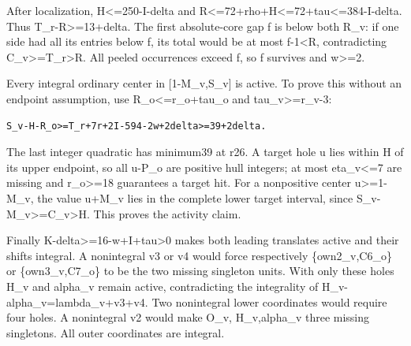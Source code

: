 \documentclass[10pt,a4paper]{article}
\theoremstyle{definition}
\begin{document}
After localization,\allowbreak{} H\textless=\allowbreak{}250-I-delta and
R\textless=\allowbreak{}72+\allowbreak{}rho+\allowbreak{}H\textless=\allowbreak{}72+\allowbreak{}tau\textless=\allowbreak{}384-I-delta. Thus
T\_\allowbreak{}r-R\textgreater=\allowbreak{}13+\allowbreak{}delta. The first absolute-core gap f is below both
R\_\allowbreak{}v: if one side had all its entries below f,\allowbreak{} its total would be at
most f-1\textless R,\allowbreak{} contradicting C\_\allowbreak{}v\textgreater=\allowbreak{}T\_\allowbreak{}r\textgreater R.
All peeled occurrences exceed f,\allowbreak{} so f survives and w\textgreater=\allowbreak{}2.

Every integral ordinary center in {[}1-M\_\allowbreak{}v,\allowbreak{}S\_\allowbreak{}v{]} is active. To prove
this without an endpoint assumption,\allowbreak{} use R\_\allowbreak{}o\textless=\allowbreak{}r\_\allowbreak{}o+\allowbreak{}tau\_\allowbreak{}o and
tau\_\allowbreak{}v\textgreater=\allowbreak{}r\_\allowbreak{}v-3:

\begin{lstlisting}
S_v-H-R_o>=T_r+7r+2I-594-2w+2delta>=39+2delta.
\end{lstlisting}

The last integer quadratic has minimum39 at r26. A target hole u lies
within H of its upper endpoint,\allowbreak{} so all u-P\_\allowbreak{}o are positive hull
integers; at most eta\_\allowbreak{}v\textless=\allowbreak{}7 are missing and r\_\allowbreak{}o\textgreater=\allowbreak{}18
guarantees a target hit. For a nonpositive center u\textgreater=\allowbreak{}1-M\_\allowbreak{}v,\allowbreak{}
the value u+\allowbreak{}M\_\allowbreak{}v lies in the complete lower target interval,\allowbreak{} since
S\_\allowbreak{}v-M\_\allowbreak{}v\textgreater=\allowbreak{}C\_\allowbreak{}v\textgreater H. This proves the activity
claim.

Finally K-delta\textgreater=\allowbreak{}16-w+\allowbreak{}I+\allowbreak{}tau\textgreater0 makes both leading
translates active and their shifts integral. A nonintegral v3 or v4
would force respectively \{own2\_\allowbreak{}v,\allowbreak{}C6\_\allowbreak{}o\} or \{own3\_\allowbreak{}v,\allowbreak{}C7\_\allowbreak{}o\} to be
the two missing singleton units. With only these holes H\_\allowbreak{}v and alpha\_\allowbreak{}v
remain active,\allowbreak{} contradicting the integrality of
H\_\allowbreak{}v-alpha\_\allowbreak{}v=\allowbreak{}lambda\_\allowbreak{}v+\allowbreak{}v3+\allowbreak{}v4. Two nonintegral lower coordinates would
require four holes. A nonintegral v2 would make O\_\allowbreak{}v,\allowbreak{} H\_\allowbreak{}v,\allowbreak{}alpha\_\allowbreak{}v
three missing singletons. All outer coordinates are integral.
\end{document}
